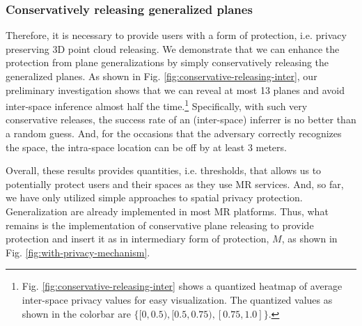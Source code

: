 \subsubsection*{Conservatively releasing generalized planes} 
Therefore, it is necessary to provide users with a form of protection, i.e. privacy preserving 3D point cloud releasing. We demonstrate that we can enhance the protection from plane generalizations by simply conservatively releasing the generalized planes. As shown in Fig. \ref{fig:conservative-releasing-inter}, our preliminary investigation shows that we can reveal at most 13 planes and avoid inter-space inference almost half the time.\footnote{Fig. \ref{fig:conservative-releasing-inter} shows a quantized heatmap of average inter-space privacy values for easy visualization. The quantized values as shown in the colorbar are $\{[0,0.5),[0.5,0.75),[0.75,1.0]\}$.} Specifically, with such very conservative releases, the success rate of an (inter-space) inferrer is no better than a random guess. And, for the occasions that the adversary correctly recognizes the space, the intra-space location can be off by at least 3 meters. %

Overall, these results provides quantities, i.e. thresholds, that allows us to potentially protect users and their spaces as they use MR services. And, so far, we have only utilized simple approaches to spatial privacy protection. Generalization are already implemented in most MR platforms. Thus, what remains is the implementation of conservative plane releasing to provide protection and insert it as in intermediary form of protection, $M$, as shown in Fig. \ref{fig:with-privacy-mechanism}.
